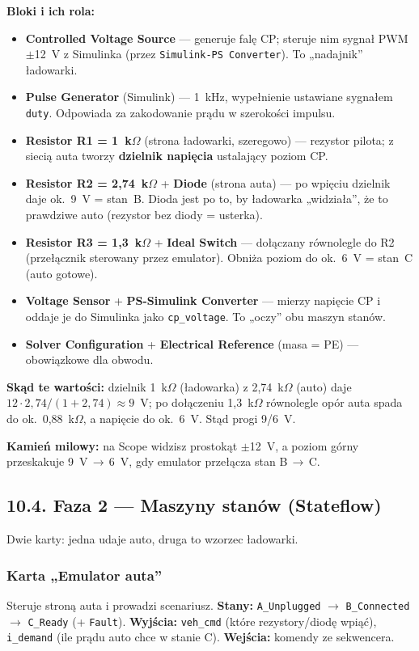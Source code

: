 \documentclass[11pt]{article}
\newcommand{\ra}{$\rightarrow$}
\newcommand{\key}[1]{\textbf{\color{navy}#1}}
\begin{document}
\key{Bloki i ich rola:}
\begin{itemize}
  \item \key{Controlled Voltage Source} --- generuje falę CP; steruje nim sygnał PWM $\pm$12~V z Simulinka (przez \texttt{Simulink-PS Converter}). To „nadajnik'' ładowarki.
  \item \key{Pulse Generator} (Simulink) --- 1~kHz, wypełnienie ustawiane sygnałem \texttt{duty}. Odpowiada za zakodowanie prądu w szerokości impulsu.
  \item \key{Resistor R1 = 1~k$\Omega$} (strona ładowarki, szeregowo) --- rezystor pilota; z siecią auta tworzy \key{dzielnik napięcia} ustalający poziom CP.
  \item \key{Resistor R2 = 2,74~k$\Omega$} + \key{Diode} (strona auta) --- po wpięciu dzielnik daje ok.\ 9~V = stan~B. Dioda jest po to, by ładowarka „widziała'', że to prawdziwe auto (rezystor bez diody = usterka).
  \item \key{Resistor R3 = 1,3~k$\Omega$} + \key{Ideal Switch} --- dołączany równolegle do R2 (przełącznik sterowany przez emulator). Obniża poziom do ok.\ 6~V = stan~C (auto gotowe).
  \item \key{Voltage Sensor} + \key{PS-Simulink Converter} --- mierzy napięcie CP i oddaje je do Simulinka jako \texttt{cp\_voltage}. To „oczy'' obu maszyn stanów.
  \item \key{Solver Configuration} + \key{Electrical Reference} (masa = PE) --- obowiązkowe dla obwodu.
\end{itemize}

\key{Skąd te wartości:} dzielnik 1~k$\Omega$ (ładowarka) z 2,74~k$\Omega$ (auto) daje $12\cdot 2{,}74/(1{+}2{,}74)\approx 9$~V; po dołączeniu 1,3~k$\Omega$ równolegle opór auta spada do ok.\ 0,88~k$\Omega$, a napięcie do ok.\ 6~V. Stąd progi 9/6~V.

\key{Kamień milowy:} na Scope widzisz prostokąt $\pm$12~V, a poziom górny przeskakuje 9~V\,\ra\,6~V, gdy emulator przełącza stan B\,\ra\,C.

\subsection{10.4. Faza 2 --- Maszyny stanów (Stateflow)}

Dwie karty: jedna udaje auto, druga to wzorzec ładowarki.

\subsubsection{Karta „Emulator auta''}
Steruje stroną auta i prowadzi scenariusz. \key{Stany:} \texttt{A\_Unplugged} \ra{} \texttt{B\_Connected} \ra{} \texttt{C\_Ready} (+ \texttt{Fault}). \key{Wyjścia:} \texttt{veh\_cmd} (które rezystory/diodę wpiąć), \texttt{i\_demand} (ile prądu auto chce w stanie C). \key{Wejścia:} komendy ze sekwencera.
\end{document}
